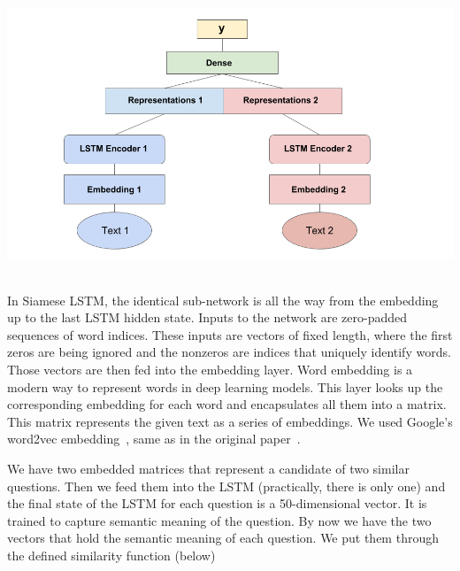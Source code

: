 \documentclass[runningheads]{llncs}
\begin{document}
	\begin{minipage}{\linewidth}
		\begin{center}
			\includegraphics[width=\linewidth]{siamese_image.png}
			\label{fig:Siamese LSTM Architectture}~\cite{ref_url22}
		\end{center}
	\end{minipage}
	\afterpage{\clearpage}
	
	In Siamese LSTM, the identical sub-network is all the way from the embedding up to the last LSTM hidden state. Inputs to the network are zero-padded sequences of word indices. These inputs are vectors of fixed length, where the first zeros are being ignored and the nonzeros are indices that uniquely identify words. Those vectors are then fed into the embedding layer. Word embedding is a modern way to represent words in deep learning models. This layer looks up the corresponding embedding for each word and encapsulates all them into a matrix. This matrix represents the given text as a series of embeddings. We used Google’s word2vec embedding~\cite{ref_url23}, same as in the original paper~\cite{ref_url24}.
	
	We have two embedded matrices that represent a candidate of two similar questions. Then we feed them into the LSTM (practically, there is only one) and the final state of the LSTM for each question is a 50-dimensional vector. It is trained to capture semantic meaning of the question. By now we have the two vectors that hold the semantic meaning of each question. We put them through the defined similarity function (below)
	
	\begin{minipage}{\linewidth}
		\begin{center}
		\end{center}
	\end{minipage}
	\afterpage{\clearpage}
	
\end{document}

